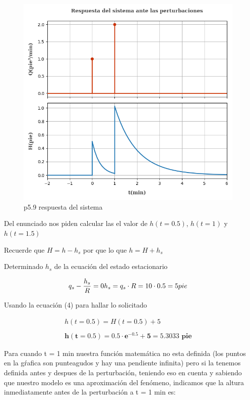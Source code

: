 \documentclass[
  letterpaper,
  DIV=11,
  numbers=noendperiod]{scrreprt}
\begin{document}
\begin{figure}

{\centering \includegraphics{././images/p5.9-coughanowr/p5.9r.png}

}

\caption{p5.9 respuesta del sistema}

\end{figure}

Del enunciado nos piden calcular las el valor de \(h(t=0.5)\),
\(h(t=1)\) y \(h(t=1.5)\)

Recuerde que \(H = h-h_s\) por que lo que \(h=H+h_s\)

Determinado \(h_s\) de la ecuación del estado estacionario

\[
q_s- \frac{h_s}{R} = 0\\
\\
h_s = q_s \cdot R = 10\cdot 0.5 = 5 pie
\]

Usando la ecuación (4) para hallar lo solicitado

\[
\begin{array}{l}
h(t=0.5) = H(t=0.5)+5\\
\\
\mathbf{h(t=0.5) = 0.5\cdot e^{-0.5} + 5 = 5.3033\text{ pie}}
\end{array}
\]

Para cuando t = 1 min nuestra función matemática no esta definida (los
puntos en la gŕafica son punteagudos y hay una pendiente infinita) pero
si la tenemos definida antes y despues de la perturbación, teniendo eso
en cuenta y sabiendo que nuestro modelo es una aproximación del
fenómeno, indicamos que la altura inmediatamente antes de la
perturbación a t = 1 min es:
\end{document}
